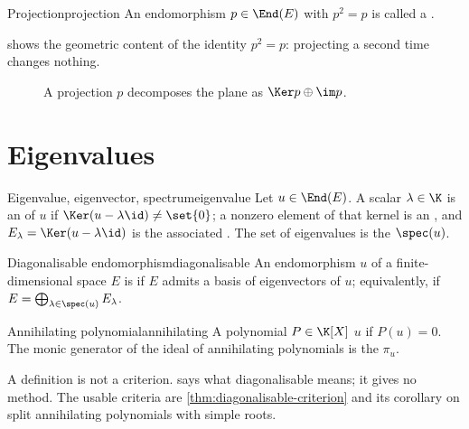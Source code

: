 \begin{definition}{Projection}{projection}
An endomorphism $p\in\End(E)$ with $p^{2}=p$ is called a .
\end{definition}

 shows the geometric content of the identity $p^2=p$:
projecting a second time changes nothing.

\begin{figure}[htbp]
  \centering
  
  \caption{A projection $p$ decomposes the plane as $\Ker p\oplus\im p$.}
  \label{fig:projection}
\end{figure}

\section{Eigenvalues}

\begin{definition}{Eigenvalue, eigenvector, spectrum}{eigenvalue}
Let $u\in\End(E)$. A scalar $\lambda\in\K$ is an  of $u$ if
$\Ker(u-\lambda\id)\neq\set{0}$; a nonzero element of that kernel is an
, and $E_\lambda=\Ker(u-\lambda\id)$ is the associated
. The set of eigenvalues is the  $\spec(u)$.
\end{definition}

\begin{definition}{Diagonalisable endomorphism}{diagonalisable}
An endomorphism $u$ of a finite-dimensional space $E$ is 
if $E$ admits a basis of eigenvectors of $u$; equivalently, if
$E=\bigoplus_{\lambda\in\spec(u)}E_\lambda$.
\end{definition}

\begin{definition}{Annihilating polynomial}{annihilating}
A polynomial $P\in\K[X]$  $u$ if $P(u)=0$. The monic
generator of the ideal of annihilating polynomials is the  $\pi_u$.
\end{definition}

\begin{warning}
A definition is not a criterion.  says what
diagonalisable means; it gives no method. The usable criteria are
\cref{thm:diagonalisable-criterion} and its corollary on split annihilating
polynomials with simple roots.
\end{warning}
